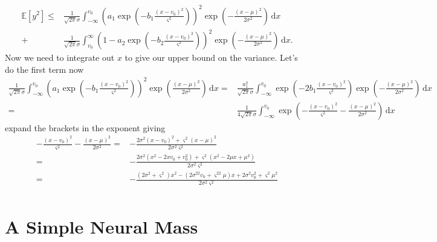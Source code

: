 \documentclass[]{article}
\begin{document}
\begin{align}
	\mathbb{E}\left[y^2\right] \le& \frac{1}{\sqrt{2\pi}\sigma}\int_{-\infty}^{v_0} \left(a_1\exp\left(-b_1\frac{(x-v_0)^2}{\varsigma^2}\right)\right)^2 \exp\left(-\frac{\left(x-\mu\right)^2}{2\sigma^2}\right) \,\mathrm{d}x \\
	+& \frac{1}{\sqrt{2\pi}\sigma}\int_{v_0}^{\infty} \left(1-a_2\exp\left(-b_2\frac{(x-v_0)^2}{\varsigma^2}\right)\right)^2 \exp\left(-\frac{\left(x-\mu\right)^2}{2\sigma^2}\right) \,\mathrm{d}x.
\end{align}
Now we need to integrate out $x$ to give our upper bound on the variance. Let's do the first term now
\begin{align}
	\frac{1}{\sqrt{2\pi}\sigma}\int_{-\infty}^{v_0} \left(a_1\exp\left(-b_1\frac{(x-v_0)^2}{\varsigma^2}\right)\right)^2 \exp\left(\frac{\left(x-\mu\right)^2}{2\sigma^2}\right) \,\mathrm{d}x =& \frac{a_1^2}{\sqrt{2\pi}\sigma}\int_{-\infty}^{v_0} \exp\left(-2b_1\frac{(x-v_0)^2}{\varsigma^2}\right) \exp\left(-\frac{\left(x-\mu\right)^2}{2\sigma^2}\right) \,\mathrm{d}x \\
	=& \frac{1}{4\sqrt{2\pi}\sigma}\int_{-\infty}^{v_0} \exp\left(-\frac{(x-v_0)^2}{\varsigma^2}-\frac{\left(x-\mu\right)^2}{2\sigma^2}\right) \,\mathrm{d}x	
\end{align}
expand the brackets in the exponent giving
\begin{align}
	-\frac{(x-v_0)^2}{\varsigma^2}-\frac{\left(x-\mu\right)^2}{2\sigma^2} =&
	-\frac{2\sigma^2(x-v_0)^2+\varsigma^2\left(x-\mu\right)^2}{2\sigma^2\varsigma^2} \\
	=& -\frac{2\sigma^2(x^2-2x v_0 +v_0^2)+\varsigma^2\left(x^2 - 2\mu x + \mu^2\right)}{2\sigma^2\varsigma^2} \\
	=& -\frac{(2\sigma^2+\varsigma^2)x^2 - (2\sigma^22v_0 + \varsigma^22\mu)x + 2\sigma^2 v_0^2 + \varsigma^2\mu^2}{2\sigma^2\varsigma^2} \\
\end{align}


\section{A Simple Neural Mass}
\end{document}
